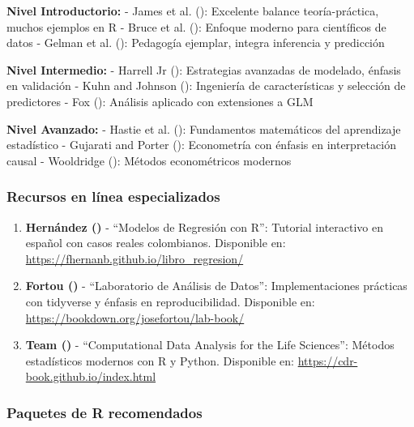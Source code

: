 \documentclass[
  oneside]{book}
\begin{document}
\textbf{Nivel Introductorio:}
- James et al. (): Excelente balance teoría-práctica, muchos ejemplos en R
- Bruce et al. (): Enfoque moderno para científicos de datos
- Gelman et al. (): Pedagogía ejemplar, integra inferencia y predicción

\textbf{Nivel Intermedio:}
- Harrell Jr (): Estrategias avanzadas de modelado, énfasis en validación
- Kuhn and Johnson (): Ingeniería de características y selección de predictores
- Fox (): Análisis aplicado con extensiones a GLM

\textbf{Nivel Avanzado:}
- Hastie et al. (): Fundamentos matemáticos del aprendizaje estadístico
- Gujarati and Porter (): Econometría con énfasis en interpretación causal
- Wooldridge (): Métodos econométricos modernos

\subsubsection{Recursos en línea especializados}\label{recursos-en-luxednea-especializados}

\begin{enumerate}
\def\labelenumi{\arabic{enumi}.}
\item
  \textbf{Hernández ()} - ``Modelos de Regresión con R'': Tutorial interactivo en español con casos reales colombianos. Disponible en: \url{https://fhernanb.github.io/libro_regresion/}
\item
  \textbf{Fortou ()} - ``Laboratorio de Análisis de Datos'': Implementaciones prácticas con tidyverse y énfasis en reproducibilidad. Disponible en: \url{https://bookdown.org/josefortou/lab-book/}
\item
  \textbf{Team ()} - ``Computational Data Analysis for the Life Sciences'': Métodos estadísticos modernos con R y Python. Disponible en: \url{https://cdr-book.github.io/index.html}
\end{enumerate}

\subsubsection{Paquetes de R recomendados}\label{paquetes-de-r-recomendados}
\end{document}
